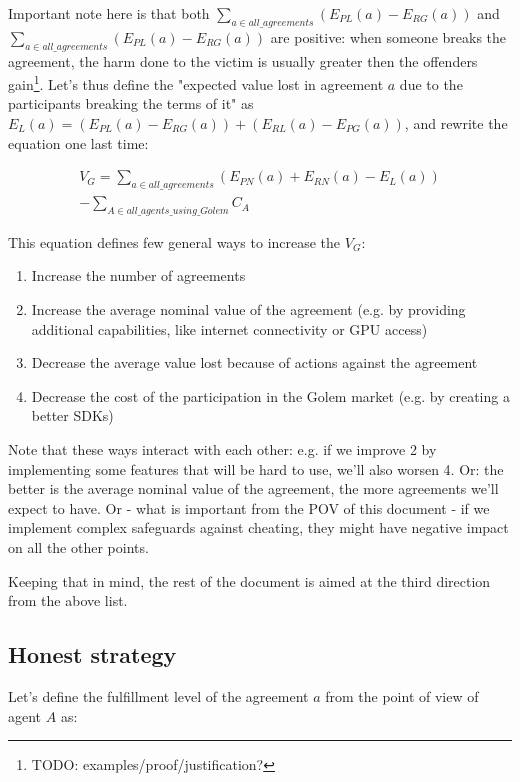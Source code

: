 \documentclass{article}
\begin{document}
Important note here is that both $\sum_{a \in all\_agreements}(E_{PL}(a)- E_{RG}(a))$ and $\sum_{a \in all\_agreements}(E_{PL}(a)- E_{RG}(a))$ are positive: 
when someone breaks the agreement, the harm done to the victim is usually greater then the offenders gain\footnote{TODO: examples/proof/justification?}.
Let's thus define the "expected value lost in agreement $a$ due to the participants breaking the terms of it" as 
$E_L(a) = (E_{PL}(a)- E_{RG}(a)) + (E_{RL}(a)- E_{PG}(a))$, and rewrite the equation one last time:

\begin{equation}
\begin{split}
    V_G = \sum_{a \in all\_agreements}(E_{PN}(a) + E_{RN}(a) - E_L(a)) \\
          - \sum_{A \in all\_agents\_using\_Golem}C_A
\end{split}
\end{equation}

This equation defines few general ways to increase the $V_G$:

\begin{enumerate}
\item Increase the number of agreements
\item Increase the average nominal value of the agreement (e.g. by providing additional capabilities, like internet connectivity or GPU access)
\item Decrease the average value lost because of actions against the agreement
\item Decrease the cost of the participation in the Golem market (e.g. by creating a better SDKs)
\end{enumerate}

Note that these ways interact with each other: e.g. if we improve 2 by implementing some features that will be hard to use, we'll also worsen 4.
Or: the better is the average nominal value of the agreement, the more agreements we'll expect to have.
Or - what is important from the POV of this document - if we implement complex safeguards against cheating, they might have negative impact on all the other points.

Keeping that in mind, the rest of the document is aimed at the third direction from the above list.

\subsection{Honest strategy}

Let's define the fulfillment level of the agreement $a$ from the point of view of agent $A$ as:
\end{document}
